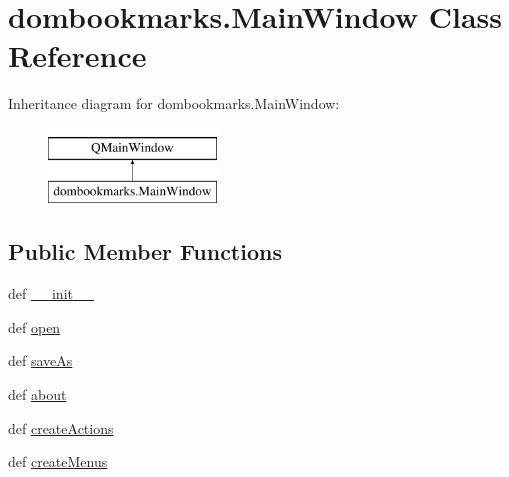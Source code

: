 \hypertarget{classdombookmarks_1_1MainWindow}{}\section{dombookmarks.\+Main\+Window Class Reference}
\label{classdombookmarks_1_1MainWindow}
Inheritance diagram for dombookmarks.\+Main\+Window\+:\begin{figure}[H]
\begin{center}
\leavevmode
\includegraphics[height=2.000000cm]{classdombookmarks_1_1MainWindow}
\end{center}
\end{figure}
\subsection*{Public Member Functions}
\begin{DoxyCompactItemize}
\item 
def \hyperlink{classdombookmarks_1_1MainWindow_a18054420ca4d633404cae1d531456794}{\+\_\+\+\_\+init\+\_\+\+\_\+}
\item 
def \hyperlink{classdombookmarks_1_1MainWindow_ac5b1d182dc76813eac78142266b94374}{open}
\item 
def \hyperlink{classdombookmarks_1_1MainWindow_a70b22c7d2673aaf65db6040e919ff76c}{save\+As}
\item 
def \hyperlink{classdombookmarks_1_1MainWindow_a1e13e5cfac9136b97cc736491b950faf}{about}
\item 
def \hyperlink{classdombookmarks_1_1MainWindow_a4910451da1f2045fcf80352d80a98746}{create\+Actions}
\item 
def \hyperlink{classdombookmarks_1_1MainWindow_a2e0fc51c11151f3a6db5528872cf1adc}{create\+Menus}
\end{DoxyCompactItemize}
